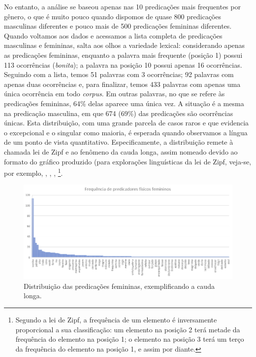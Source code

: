 \documentclass[portuguese]{textolivre}
\begin{document}
No entanto, a análise se baseou apenas nas 10 predicações mais frequentes por gênero, o que é muito pouco quando dispomos de quase 800 predicações masculinas diferentes e pouco mais de 500 predicações femininas diferentes. Quando voltamos aos dados e acessamos a lista completa de predicações masculinas e femininas, salta aos olhos a variedade lexical: considerando apenas as predicações femininas, enquanto a palavra mais frequente (posição 1) possui 113 ocorrências (\textit{bonita}); a palavra na posição 10 possui apenas 16 ocorrências. Seguindo com a lista, temos 51 palavras com 3 ocorrências; 92 palavras com apenas duas ocorrências e, para finalizar, temos 433 palavras com apenas uma única ocorrência em todo \textit{corpus}. Em outras palavras, no que se refere às predicações femininas, 64\% delas aparece uma única vez. A situação é a mesma na predicação masculina, em que 674 (69\%) das predicações são ocorrências únicas. Esta distribuição, com uma grande parcela de casos raros e que evidencia o excepcional e o singular como maioria, é esperada quando observamos a língua de um ponto de vista quantitativo. Especificamente, a distribuição remete à chamada lei de Zipf e ao fenômeno da cauda longa, assim nomeado devido ao formato do gráfico produzido (para explorações linguísticas da lei de Zipf, veja-se, por exemplo, \textcite{manning1999}, \textcite{santos2008}, \textcite{santos2014}, \textcite{freitas2017}\footnote{Segundo a lei de Zipf, a frequência de um elemento é inversamente proporcional a sua classificação: um elemento na posição 2 terá metade da frequência do elemento na posição 1; o elemento na posição 3 terá um terço da frequência do elemento na posição 1, e assim por diante.}.  

\begin{figure}[htbp]
 \centering
 \includegraphics[width=\textwidth]{Fig1.png}
 \caption{Distribuição das predicações femininas, exemplificando a cauda longa.}
 \label{fig1}
\end{figure}
\end{document}
